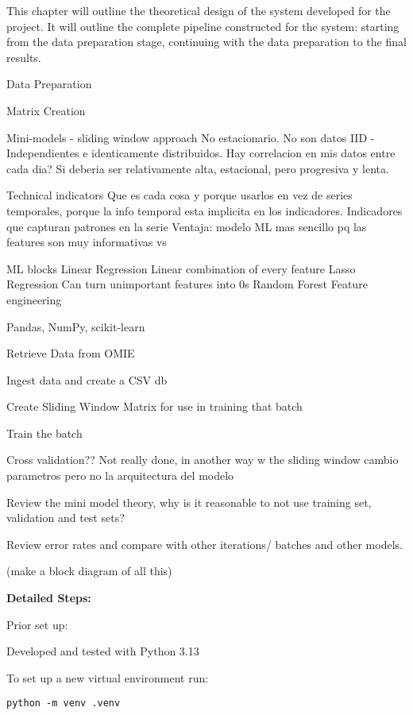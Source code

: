 \documentclass[12pt]{report} %
\begin{document}
This chapter will outline the theoretical design of the system developed for the project. It will outline the complete pipeline constructed for the system: starting from the data preparation stage, continuing with the data preparation to the final results.


Data Preparation

Matrix Creation

Mini-models - sliding window approach
No estacionario. No son datos IID - Independientes e identicamente distribuidos.
Hay correlacion en mis datos entre cada dia? Si deberia ser relativamente alta, estacional, pero progresiva y lenta.

Technical indicators
Que es cada cosa y porque usarlos en vez de series temporales, porque la info temporal esta implicita en los indicadores.
Indicadores que capturan patrones en la serie
Ventaja: modelo ML mas sencillo pq las features son muy informativas vs

ML blocks
    Linear Regression
        Linear combination of every feature
    Lasso Regression
        Can turn unimportant features into 0s
    Random Forest
        Feature engineering

Pandas, NumPy, scikit-learn


Retrieve Data from OMIE

Ingest data and create a CSV db

Create Sliding Window Matrix for use in training that batch

Train the batch

Cross validation?? Not really done, in another way w the sliding window
cambio parametros pero no la arquitectura del modelo

Review the mini model theory, why is it reasonable to not use training set, validation and test sets?

Review error rates and compare with other iterations/ batches and other models.

(make a block diagram of all this)

\noindent \textbf{Detailed Steps:}

Prior set up:

Developed and tested with Python 3.13 \cite{python}

To set up a new virtual environment \cite{python_venv} run:
\begin{verbatim}
python -m venv .venv
\end{verbatim}
\end{document}
